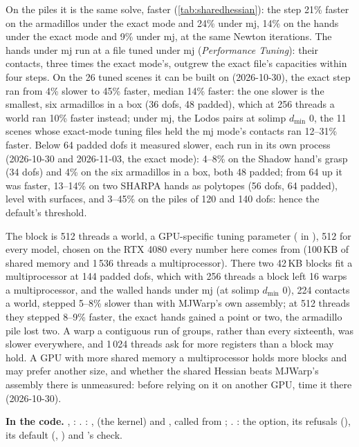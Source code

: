 On the piles it is the same solve, faster (\cref{tab:sharedhessian}): the step 21\% faster on the armadillos under the exact mode and 24\% under mj, 14\% on the hands under the exact mode and 9\% under mj, at the same Newton iterations. The hands under mj run at a file tuned under mj (\emph{Performance Tuning}): their contacts, three times the exact mode's, outgrew the exact file's capacities within four steps. On the 26 tuned scenes it can be built on (2026-10-30), the exact step ran from 4\% slower to 45\% faster, median 14\% faster: the one slower is the smallest, six armadillos in a box (36 dofs, 48 padded), which at 256 threads a world ran 10\% faster instead; under mj, the Lodos pairs at solimp $d_{\min}$ 0, the 11 scenes whose exact-mode tuning files held the mj mode's contacts ran 12--31\% faster. Below 64 padded dofs it measured slower, each run in its own process (2026-10-30 and 2026-11-03, the exact mode): 4--8\% on the Shadow hand's grasp (34 dofs) and 4\% on the six armadillos in a box, both 48 padded; from 64 up it was faster, 13--14\% on two SHARPA hands as polytopes (56 dofs, 64 padded), level with surfaces, and 3--45\% on the piles of 120 and 140 dofs: hence the default's threshold.

The block is 512 threads a world, a GPU-specific tuning parameter ( in ), 512 for every model, chosen on the RTX 4080 every number here comes from (100\,KB of shared memory and 1\,536 threads a multiprocessor). There two 42\,KB blocks fit a multiprocessor at 144 padded dofs, which with 256 threads a block left 16 warps a multiprocessor, and the walled hands under mj (at solimp $d_{\min}$ 0), 224 contacts a world, stepped 5--8\% slower than with MJWarp's own assembly; at 512 threads they stepped 8--9\% faster, the exact hands gained a point or two, the armadillo pile lost two. A warp a contiguous run of groups, rather than every sixteenth, was slower everywhere, and 1\,024 threads ask for more registers than a block may hold. A GPU with more shared memory a multiprocessor holds more blocks and may prefer another size, and whether the shared Hessian beats MJWarp's assembly there is unmeasured: before relying on it on another GPU, time it there (2026-10-30).

\begin{codebox}
\textbf{In the code.} , : . : ,  (the kernel) and , called from ; . : the option, its refusals (), its default (, ) and 's check.
\end{codebox}

